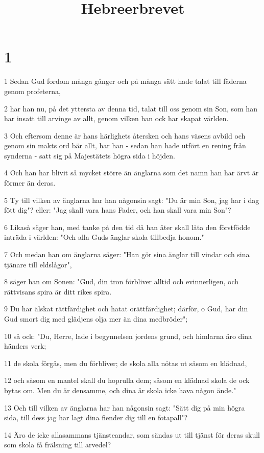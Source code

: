 

\title{Hebreerbrevet}


\chapter{1}

\par 1 Sedan Gud fordom många gånger och på många sätt hade talat till fäderna genom profeterna,
\par 2 har han nu, på det yttersta av denna tid, talat till oss genom sin Son, som han har insatt till arvinge av allt, genom vilken han ock har skapat världen.
\par 3 Och eftersom denne är hans härlighets återsken och hans väsens avbild och genom sin makts ord bär allt, har han - sedan han hade utfört en rening från synderna - satt sig på Majestätets högra sida i höjden.
\par 4 Och han har blivit så mycket större än änglarna som det namn han har ärvt är förmer än deras.
\par 5 Ty till vilken av änglarna har han någonsin sagt: "Du är min Son, jag har i dag fött dig"? eller: "Jag skall vara hans Fader, och han skall vara min Son"?
\par 6 Likaså säger han, med tanke på den tid då han åter skall låta den förstfödde inträda i världen: "Och alla Guds änglar skola tillbedja honom."
\par 7 Och medan han om änglarna säger: "Han gör sina änglar till vindar och sina tjänare till eldslågor",
\par 8 säger han om Sonen: "Gud, din tron förbliver alltid och evinnerligen, och rättvisans spira är ditt rikes spira.
\par 9 Du har älskat rättfärdighet och hatat orättfärdighet; därför, o Gud, har din Gud smort dig med glädjens olja mer än dina medbröder";
\par 10 så ock: "Du, Herre, lade i begynnelsen jordens grund, och himlarna äro dina händers verk;
\par 11 de skola förgås, men du förbliver; de skola alla nötas ut såsom en klädnad,
\par 12 och såsom en mantel skall du hoprulla dem; såsom en klädnad skola de ock bytas om. Men du är densamme, och dina år skola icke hava någon ände."
\par 13 Och till vilken av änglarna har han någonsin sagt: "Sätt dig på min högra sida, till dess jag har lagt dina fiender dig till en fotapall"?
\par 14 Äro de icke allasammans tjänsteandar, som sändas ut till tjänst för deras skull som skola få frälsning till arvedel?

